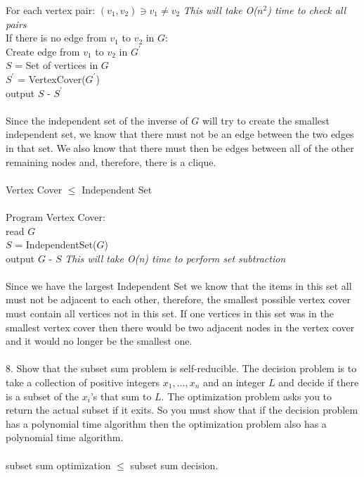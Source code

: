 \documentclass[10pt]{article}
\newcommand{\tab}{\hspace*{2em}}
\newcommand{\tabb}{\hspace*{4em}}
\newcommand{\tabbb}{\hspace*{6em}}
\begin{document}
	\tab For each vertex pair: $(v_1, v_2) \ni v_1 \neq v_2$ \emph{This will take O($n^2$) time to check all pairs}\\
	\tabb If there is no edge from $v_1$ to $v_2$ in $G$:\\
	\tabbb Create edge from $v_1$ to $v_2$ in $G^\prime$\\
	\tab $S$ = Set of vertices in $G$\\
	\tab $S^{\prime}$ = VertexCover($G^{\prime}$)\\
	\tab output $S$ - $S^{\prime}$\\
	\\
	Since the independent set of the inverse of $G$ will try to create the smallest independent set, we know that there must
	not be an edge between the two edges in that set. We also know that there must then be edges between all of the other remaining
	nodes and, therefore, there is a clique. 
	\\
	\\
	Vertex Cover $\leq$ Independent Set\\
	\\
	Program Vertex Cover:\\
	\tab read $G$\\
	\tab $S$ = IndependentSet($G$)\\
	\tab output $G$ - $S$ \emph{This will take O(n) time to perform set subtraction}\\
	\\
	Since we have the largest Independent Set we know that the items in this set all must not be adjacent to 
	each other, therefore, the smallest possible vertex cover must contain all vertices not in this set. If one
	vertices in this set was in the smallest vertex cover then there would be two adjacent nodes in the vertex
	cover and it would no longer be the smallest one.\\
	\\
	8. Show that the subset sum problem is self-reducible. The decision problem is to take a collection of
		positive integers $x_1, \ldots, x_n$ and an integer $L$ and decide if there is a subset of the $x_i$’s that sum to
		$L$. The optimization problem asks you to return the actual subset if it exits. So you must show that
		if the decision problem has a polynomial time algorithm then the optimization problem also has a
		polynomial time algorithm.\\
		\\
		subset sum optimization $\leq$ subset sum decision.\\
		\\
\end{document}
